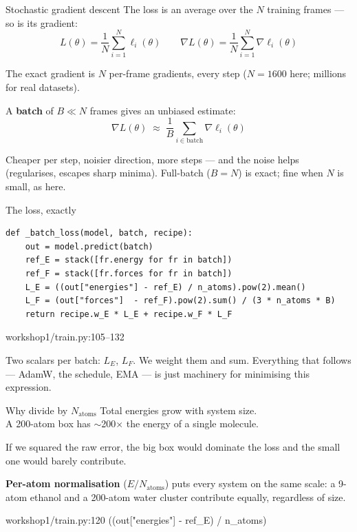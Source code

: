 \documentclass[aspectratio=169,11pt]{beamer}
\newcommand{\srcref}[1]{{\color{muted}\ttfamily\footnotesize #1}}
\begin{document}
\begin{frame}{Stochastic gradient descent}
  The loss is an average over the $N$ training frames --- so is its
  gradient:
  \[
    L(\theta) = \frac{1}{N}\sum_{i=1}^{N} \ell_i(\theta)
    \qquad
    \nabla L(\theta) = \frac{1}{N}\sum_{i=1}^{N} \nabla \ell_i(\theta)
  \]

  The exact gradient is $N$ per-frame gradients, every step
  ($N=1600$ here; millions for real datasets).

  \vspace{0.6em}
  A \textbf{batch} of $B \ll N$ frames gives an unbiased estimate:
  \[
    \nabla L(\theta) \;\approx\; \frac{1}{B}\sum_{i \in \text{batch}} \nabla \ell_i(\theta)
  \]

  Cheaper per step, noisier direction, more steps --- and the noise
  helps (regularises, escapes sharp minima). Full-batch ($B=N$) is
  exact; fine when $N$ is small, as here.
\end{frame}

\begin{frame}[fragile]{The loss, exactly}
\begin{lstlisting}
def _batch_loss(model, batch, recipe):
    out = model.predict(batch)
    ref_E = stack([fr.energy for fr in batch])
    ref_F = stack([fr.forces for fr in batch])
    L_E = ((out["energies"] - ref_E) / n_atoms).pow(2).mean()
    L_F = (out["forces"]  - ref_F).pow(2).sum() / (3 * n_atoms * B)
    return recipe.w_E * L_E + recipe.w_F * L_F
\end{lstlisting}
  \vspace{0.4em}
  \srcref{workshop1/train.py:105--132}

  \vspace{0.6em}
  Two scalars per batch: $L_E$, $L_F$. We weight them and sum.
  Everything that follows --- AdamW, the schedule, EMA --- is just
  machinery for minimising this expression.
\end{frame}

\begin{frame}{Why divide by $N_{\mathrm{atoms}}$}
  Total energies grow with system size. \\
  A 200-atom box has $\sim$200$\times$ the energy of a single molecule.

  \vspace{0.6em}
  If we squared the raw error, the big box would dominate the loss and
  the small one would barely contribute.

  \vspace{0.6em}
  \textbf{Per-atom normalisation} ($E / N_{\mathrm{atoms}}$) puts every
  system on the same scale: a 9-atom ethanol and a 200-atom water cluster
  contribute equally, regardless of size.

  \vspace{0.8em}
  \srcref{workshop1/train.py:120  ((out["energies"] - ref\_E) / n\_atoms)}
\end{frame}
\end{document}
